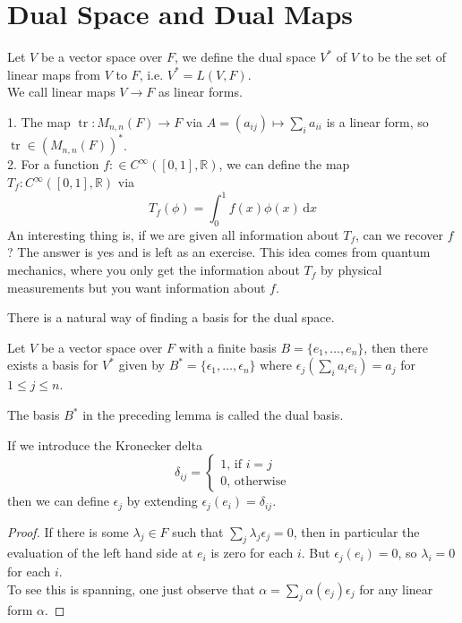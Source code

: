 \section{Dual Space and Dual Maps}
\begin{definition}
    Let $V$ be a vector space over $F$, we define the dual space $V^\ast$ of $V$ to be the set of linear maps from $V$ to $F$, i.e. $V^\ast=L(V,F)$.\\
    We call linear maps $V\to F$ as linear forms.
\end{definition}
\begin{example}
    1. The map $\operatorname{tr}:M_{n,n}(F)\to F$ via $A=(a_{ij})\mapsto\sum_ia_{ii}$ is a linear form, so $\operatorname{tr}\in (M_{n,n}(F))^\ast$.\\
    2. For a function $f:\in C^{\infty}([0,1],\mathbb R)$, we can define the map $T_f:C^{\infty}([0,1],\mathbb R)$ via
    $$T_f(\phi)=\int_0^1f(x)\phi(x)\,\mathrm dx$$
    An interesting thing is, if we are given all information about $T_f$, can we recover $f$?
    The answer is yes and is left as an exercise.
    This idea comes from quantum mechanics, where you only get the information about $T_f$ by physical measurements but you want information about $f$.
\end{example}
There is a natural way of finding a basis for the dual space.
\begin{lemma}
    Let $V$ be a vector space over $F$ with a finite basis $B=\{e_1,\ldots,e_n\}$, then there exists a basis for $V^\ast$ given by
    $B^\ast=\{\epsilon_1,\ldots,\epsilon_n\}$ where $\epsilon_j(\sum_ia_ie_i)=a_j$ for $1\le j\le n$.
\end{lemma}
\begin{definition}
    The basis $B^\ast$ in the preceding lemma is called the dual basis.
\end{definition}
\begin{remark}
    If we introduce the Kronecker delta
    $$\delta_{ij}=\begin{cases}
        1\text{, if $i=j$}\\
        0\text{, otherwise}
    \end{cases}$$
    then we can define $\epsilon_j$ by extending $\epsilon_j(e_i)=\delta_{ij}$.
\end{remark}
\begin{proof}
    If there is some $\lambda_j\in F$ such that $\sum_j\lambda_j\epsilon_j=0$, then in particular the evaluation of the left hand side at $e_i$ is zero for each $i$.
    But $\epsilon_j(e_i)=0$, so $\lambda_i=0$ for each $i$.\\
    To see this is spanning, one just observe that $\alpha=\sum_j\alpha(e_j)\epsilon_j$ for any linear form $\alpha$.
\end{proof}
